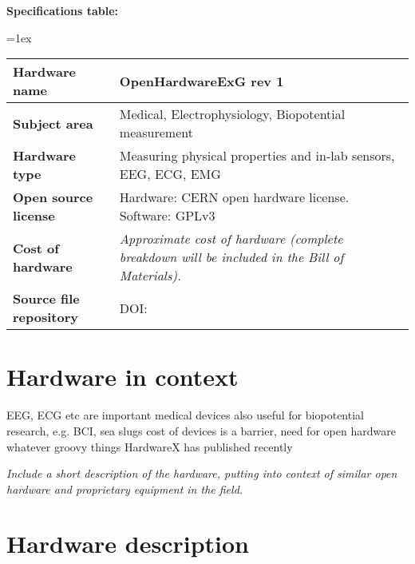 \documentclass[11pt, letterpaper]{article}
\begin{document}
\begin{flushleft}
\newpage
\textbf{Specifications table:}

\tabulinesep=1ex
\begin{tabu} to \linewidth {|X|X[3,l]|}
\hline  \textbf{Hardware name} & OpenHardwareExG rev 1 \\
  \hline \textbf{Subject area} & Medical, Electrophysiology, Biopotential measurement\\
  \hline \textbf{Hardware type} & Measuring physical properties and in-lab sensors, EEG, ECG, EMG \\
\hline \textbf{Open source license} &
 Hardware: CERN open hardware license.\cite{CERNOHL} Software: GPLv3\cite{GPLv3} \\
\hline \textbf{Cost of hardware} &
  \textit{Approximate cost of hardware (complete breakdown will be included in the Bill of Materials).}
  \\
\hline \textbf{Source file repository} &
  DOI: 
\linebreak
\\\hline
\end{tabu}
\end{flushleft}

\section{Hardware in context}
EEG, ECG etc are important medical devices
also useful for biopotential research, e.g. BCI, sea slugs
cost of devices is a barrier, need for open hardware
whatever groovy things HardwareX has published recently

\textit{Include a short description of the hardware, putting into context of similar open hardware and proprietary equipment in the field.}
\section{Hardware description}
\end{document}
